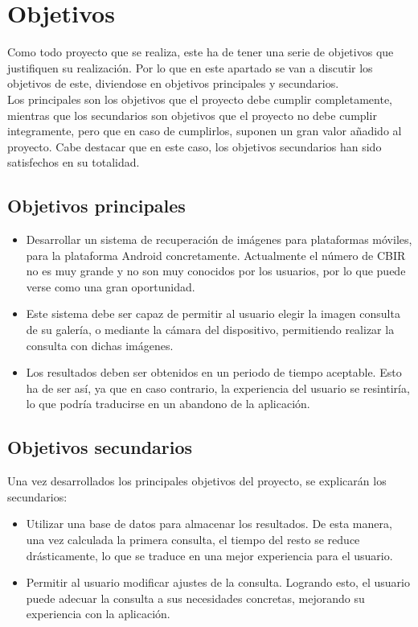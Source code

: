 \chapter{Objetivos}
\label{cap:objetivos}

Como todo proyecto que se realiza, este ha de tener una serie de objetivos que justifiquen su realización. Por lo que en este apartado se van a discutir los objetivos de este, diviendose en objetivos principales y secundarios.\\

Los principales son los objetivos que el proyecto debe cumplir completamente, mientras que los secundarios son objetivos que el proyecto no debe cumplir integramente, pero que en caso de cumplirlos, suponen un gran valor añadido al proyecto. Cabe destacar que en este caso, los objetivos secundarios han sido satisfechos en su totalidad.\\

\section{Objetivos principales}

\begin{itemize}
  \item Desarrollar un sistema de recuperación de imágenes para plataformas móviles, para la plataforma Android concretamente. Actualmente el número de CBIR no es muy grande y no son muy conocidos por los usuarios, por lo que puede verse como una gran oportunidad.
  
  \item Este sistema debe ser capaz de permitir al usuario elegir la imagen consulta de su galería, o mediante la cámara del dispositivo, permitiendo realizar la consulta con dichas imágenes.
  
  \item Los resultados deben ser obtenidos en un periodo de tiempo aceptable. Esto ha de ser así, ya que en caso contrario, la experiencia del usuario se resintiría, lo que podría traducirse en un abandono de la aplicación.  
  
\end{itemize}


\section{Objetivos secundarios}

Una vez desarrollados los principales objetivos del proyecto, se explicarán los secundarios:

\begin{itemize}
  \item Utilizar una base de datos para almacenar los resultados. De esta manera, una vez calculada la primera consulta, el tiempo del resto se reduce drásticamente, lo que se traduce en una mejor experiencia para el usuario.

  \item Permitir al usuario modificar ajustes de la consulta. Logrando esto, el usuario puede adecuar la consulta a sus necesidades concretas, mejorando su experiencia con la aplicación.
\end{itemize}
